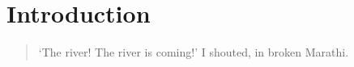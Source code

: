 \chapter{Introduction}

\blockquote{
%
%	
%	
%	
%	
%	
%	
	`The river! The river is coming!' I shouted, in broken Marathi.

}
